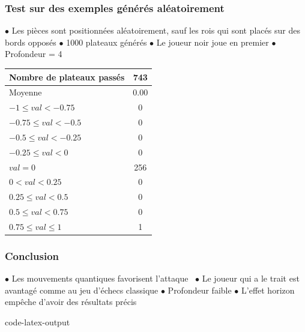 \documentclass[11pt]{beamer}
\begin{document}
\begin{frame}
	\frametitle{Test sur des exemples générés aléatoirement}
	$\bullet $ Les pièces sont positionnées aléatoirement, sauf les rois qui sont placés sur des bords opposés \newline
	$\bullet$ 1000 plateaux générés \newline
	$\bullet $ Le joueur noir joue en premier \newline
	$\bullet $ Profondeur = 4
	\begin{center}
		\begin{tabular}{ | l | c | }
			\hline
			Nombre de plateaux passés & 743 \\ \hline
			Moyenne & 0.00 \\ \hline
			$-1 \leq val < -0.75$ & 0  \\ \hline
			$-0.75 \leq val < -0.5$ & 0  \\ \hline
			$-0.5 \leq val < -0.25$ & 0  \\ \hline
			$-0.25 \leq val < 0$ & 0 \\ \hline
			$val = 0 $   & 256  \\ \hline
			$0 < val < 0.25$ & 0  \\ \hline
			$0.25 \leq val < 0.5$ & 0  \\ \hline
			$0.5 \leq val < 0.75$ & 0  \\ \hline
			$0.75 \leq val \leq 1$ & 1  \\
			\hline
		\end{tabular}
	\end{center}
\end{frame}

	\begin{frame}
	\frametitle{Conclusion}
	$\bullet$ Les mouvements quantiques favorisent l'attaque \newline
	$\bullet$ Le joueur qui a le trait est avantagé comme au jeu d'échecs classique \newline
	$\bullet$ Profondeur faible \newline
	$\bullet$ L'effet horizon empêche d'avoir des résultats précis \newline
	
\end{frame}

	{code-latex-output}      
\end{document}
